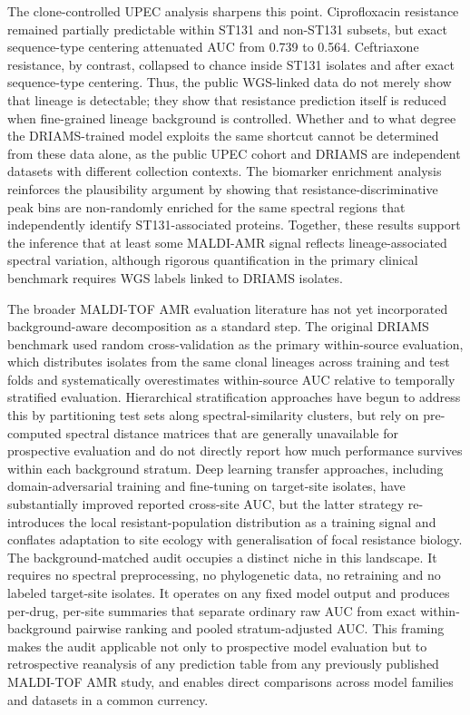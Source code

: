 \documentclass[11pt]{article}
\begin{document}
The clone-controlled UPEC analysis sharpens this point. Ciprofloxacin resistance remained partially predictable within ST131 and non-ST131 subsets, but exact sequence-type centering attenuated AUC from 0.739 to 0.564. Ceftriaxone resistance, by contrast, collapsed to chance inside ST131 isolates and after exact sequence-type centering. Thus, the public WGS-linked data do not merely show that lineage is detectable; they show that resistance prediction itself is reduced when fine-grained lineage background is controlled. Whether and to what degree the DRIAMS-trained model exploits the same shortcut cannot be determined from these data alone, as the public UPEC cohort and DRIAMS are independent datasets with different collection contexts. The biomarker enrichment analysis reinforces the plausibility argument by showing that resistance-discriminative peak bins are non-randomly enriched for the same spectral regions that independently identify ST131-associated proteins. Together, these results support the inference that at least some MALDI-AMR signal reflects lineage-associated spectral variation, although rigorous quantification in the primary clinical benchmark requires WGS labels linked to DRIAMS isolates.

The broader MALDI-TOF AMR evaluation literature has not yet incorporated background-aware decomposition as a standard step. The original DRIAMS benchmark used random cross-validation as the primary within-source evaluation, which distributes isolates from the same clonal lineages across training and test folds and systematically overestimates within-source AUC relative to temporally stratified evaluation. Hierarchical stratification approaches have begun to address this by partitioning test sets along spectral-similarity clusters\cite{weis2022stratification}, but rely on pre-computed spectral distance matrices that are generally unavailable for prospective evaluation and do not directly report how much performance survives within each background stratum. Deep learning transfer approaches, including domain-adversarial training and fine-tuning on target-site isolates, have substantially improved reported cross-site AUC, but the latter strategy re-introduces the local resistant-population distribution as a training signal and conflates adaptation to site ecology with generalisation of focal resistance biology. The background-matched audit occupies a distinct niche in this landscape. It requires no spectral preprocessing, no phylogenetic data, no retraining and no labeled target-site isolates. It operates on any fixed model output and produces per-drug, per-site summaries that separate ordinary raw AUC from exact within-background pairwise ranking and pooled stratum-adjusted AUC. This framing makes the audit applicable not only to prospective model evaluation but to retrospective reanalysis of any prediction table from any previously published MALDI-TOF AMR study, and enables direct comparisons across model families and datasets in a common currency.
\end{document}
